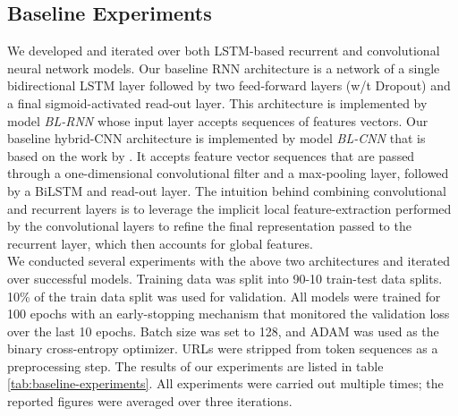 \documentclass[11pt]{article}
\begin{document}
\subsection{Baseline Experiments}
We developed and iterated over both LSTM-based \cite{hochreiter1997long} recurrent and convolutional \cite{o2015introduction}
neural network models. Our baseline RNN architecture is a network of a single bidirectional LSTM layer followed by two feed-forward layers (w/t Dropout) and a final sigmoid-activated read-out layer. This architecture is implemented by model \emph{BL-RNN}
whose input layer accepts sequences of features vectors. Our baseline hybrid-CNN architecture is implemented by model
\emph{BL-CNN} that is based on the work by . It accepts feature vector
sequences that are passed through a one-dimensional convolutional filter and a max-pooling layer, followed by a BiLSTM and read-out
layer. The intuition behind combining convolutional and recurrent layers is to leverage the implicit local feature-extraction performed by the convolutional layers to refine the final representation passed to the recurrent layer, which then accounts for global features.\\

We conducted several experiments with the above two architectures and iterated over successful models. Training data was split into 90-10 train-test data splits.
10\% of the train data split was used for validation. All models were trained for 100 epochs with an early-stopping mechanism
that monitored the validation loss over the last 10 epochs. Batch size was set to 128, and ADAM \cite{kingma2014adam} was used
as the binary cross-entropy optimizer. URLs were stripped from token sequences as a preprocessing step. The results of our experiments are listed in table \ref{tab:baseline-experiments}. All experiments were carried out multiple times; the reported
figures were averaged over three iterations.\\
\end{document}

